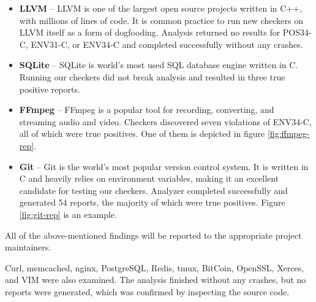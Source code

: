 \begin{itemize}
    \item \textbf{LLVM} -- LLVM \cite{llvm} is one of the largest open source projects written in C++, with millions of lines of code. It is common practice to run new checkers on LLVM itself as a form of dogfooding. Analysis returned no results for POS34-C, ENV31-C, or ENV34-C and completed successfully without any crashes. 
    \item \textbf{SQLite} -- SQLite \cite{sqlite} is world's most used SQL database engine written in C. Running our checkers did not break analysis and resulted in three true positive reports. 
    \item \textbf{FFmpeg} -- FFmpeg \cite{ffmpeg} is a popular tool for recording, converting, and streaming audio and video. Checkers discovered seven violations of ENV34-C, all of which were true positives. One of them is depicted in figure \ref{fig:ffmpeg-rep}.
    \item \textbf{Git} -- Git \cite{git} is the world's most popular version control system. It is written in C and heavily relies on environment variables, making it an excellent candidate for testing our checkers. Analyzer completed successfully and generated 54 reports, the majority of which were true positives. Figure \ref{fig:git-rep} is an example.
\end{itemize}

All of the above-mentioned findings will be reported to the appropriate project maintainers. 

Curl, memcached, nginx, PostgreSQL, Redis, tmux, BitCoin, OpenSSL, Xerces, and VIM were also examined. The analysis finished without any crashes, but no reports were generated, which was confirmed by inspecting the source code.

